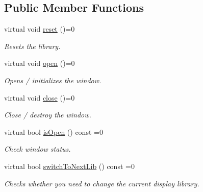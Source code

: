 \subsection*{Public Member Functions}
\begin{DoxyCompactItemize}
\item 
\mbox{\label{classArcade_1_1Display_1_1IDisplayModule_a2a05e0a55f30774cb8a75be63663b6f9}} 
virtual void \mbox{\hyperlink{classArcade_1_1Display_1_1IDisplayModule_a2a05e0a55f30774cb8a75be63663b6f9}{reset}} ()=0
\begin{DoxyCompactList}\small\item\em Resets the library. \end{DoxyCompactList}\item 
\mbox{\label{classArcade_1_1Display_1_1IDisplayModule_ae1984127ec0c8a73e4f26ee4517bd226}} 
virtual void \mbox{\hyperlink{classArcade_1_1Display_1_1IDisplayModule_ae1984127ec0c8a73e4f26ee4517bd226}{open}} ()=0
\begin{DoxyCompactList}\small\item\em Opens / initializes the window. \end{DoxyCompactList}\item 
\mbox{\label{classArcade_1_1Display_1_1IDisplayModule_a689bccd57c13b1706d491870111519e3}} 
virtual void \mbox{\hyperlink{classArcade_1_1Display_1_1IDisplayModule_a689bccd57c13b1706d491870111519e3}{close}} ()=0
\begin{DoxyCompactList}\small\item\em Close / destroy the window. \end{DoxyCompactList}\item 
virtual bool \mbox{\hyperlink{classArcade_1_1Display_1_1IDisplayModule_a34c86dd2e7aa60a70c0cc06ccbd34e47}{is\+Open}} () const =0
\begin{DoxyCompactList}\small\item\em Check window status. \end{DoxyCompactList}\item 
virtual bool \mbox{\hyperlink{classArcade_1_1Display_1_1IDisplayModule_a0de47361c9d47bf8fc52070b945f23b7}{switch\+To\+Next\+Lib}} () const =0
\begin{DoxyCompactList}\small\item\em Checks whether you need to change the current display library. \end{DoxyCompactList}\item 

\end{DoxyCompactItemize}
